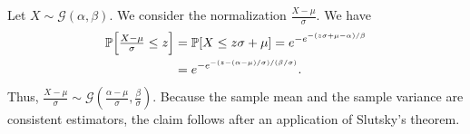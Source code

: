 \documentclass[10pt,journal,compsoc]{IEEEtran}
\theoremstyle{definition}
\begin{document}
\begin{IEEEproof}[Theorem~6]
  Let $ X \sim \mathcal{G}(\alpha, \beta)$. We consider the
  normalization $\tfrac{X - \mu}{\sigma}$. We have
  \begin{equation*}
    \begin{split}
    \mathbb{P}\Bigl[ \tfrac{X - \mu}{\sigma} \leq z\Bigr]  &= \mathbb{P}[X \leq z
    \sigma + \mu] 
    = e^{-e^{-(z \sigma + \mu - \alpha)/\beta}} \\
      &= e^{- e^{-(z - (\alpha - \mu)/\sigma)/(\beta/\sigma)}}.
    \end{split}
  \end{equation*}
  Thus, $\tfrac{X - \mu}{\sigma} \sim \mathcal{G}(\tfrac{\alpha -
    \mu}{\sigma}, \tfrac{\beta}{\sigma})$. Because the sample
  mean and the sample variance are consistent estimators, the claim
  follows after an application of Slutsky's theorem.
\end{IEEEproof}
\end{document}
